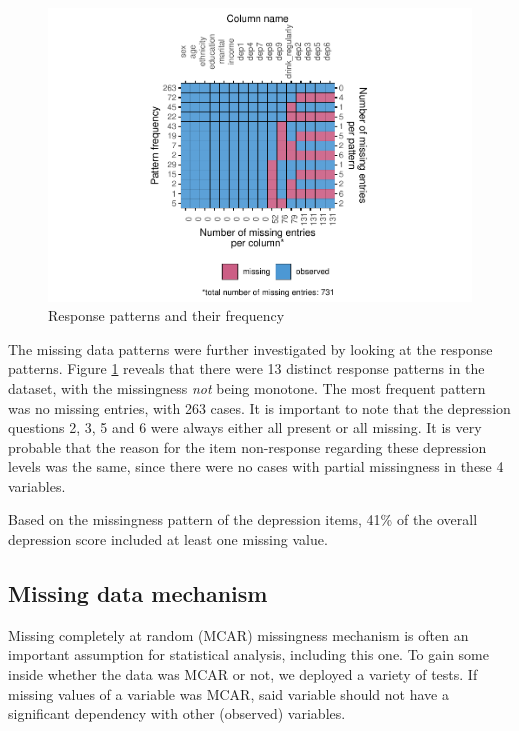 \documentclass[
]{article}
\begin{document}
\begin{figure}
\centering
\includegraphics{report_files/figure-latex/res-pattern-1.pdf}
\caption{\label{fig:res-pattern}Response patterns and their frequency}
\end{figure}

The missing data patterns were further investigated by looking at the response patterns. Figure \ref{fig:res-pattern} reveals that there were 13 distinct response patterns in the dataset, with the missingness \emph{not} being monotone. The most frequent pattern was no missing entries, with 263 cases. It is important to note that the depression questions 2, 3, 5 and 6 were always either all present or all missing. It is very probable that the reason for the item non-response regarding these depression levels was the same, since there were no cases with partial missingness in these 4 variables.

Based on the missingness pattern of the depression items, 41\% of the overall depression score included at least one missing value.

\hypertarget{MDM}{%
\subsection{Missing data mechanism}\label{MDM}}

Missing completely at random (MCAR) missingness mechanism is often an important assumption for statistical analysis, including this one. To gain some inside whether the data was MCAR or not, we deployed a variety of tests. If missing values of a variable was MCAR, said variable should not have a significant dependency with other (observed) variables.
\end{document}
